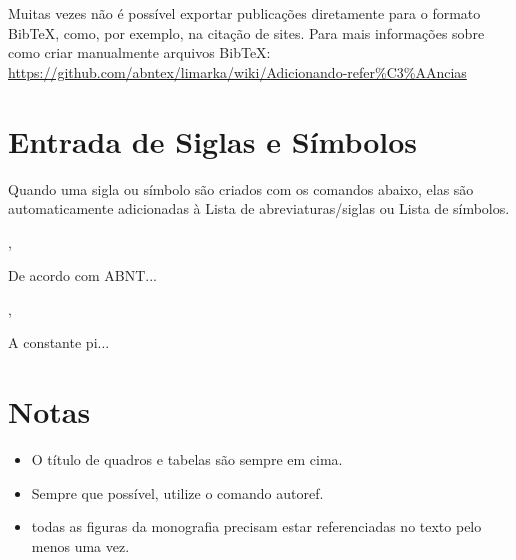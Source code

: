 Muitas vezes não é possível exportar publicações diretamente para o formato BibTeX, como, por exemplo, na citação de sites. Para mais informações sobre como criar manualmente arquivos BibTeX: \url{https://github.com/abntex/limarka/wiki/Adicionando-refer%C3%AAncias}

\section{Entrada de Siglas e Símbolos}
Quando uma sigla ou símbolo são criados com os comandos abaixo, elas são automaticamente adicionadas à Lista de abreviaturas/siglas ou Lista de símbolos.

, 

De acordo com \acs{ABNT}...






, 


 

A constante \gls{pi}... 
 
\section{Notas}
\begin{itemize}
    \item O título de quadros e tabelas são sempre em cima.
    \item Sempre que possível, utilize o comando autoref.
    \item todas as figuras da monografia precisam estar referenciadas no texto pelo menos uma vez.
\end{itemize}